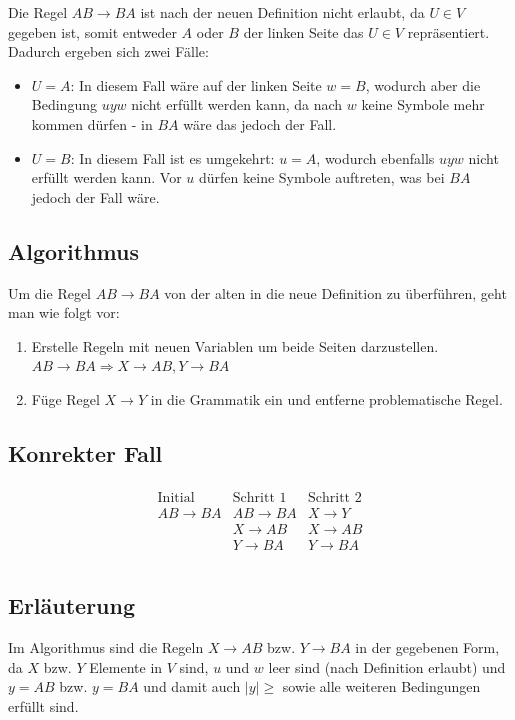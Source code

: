 \documentclass{article}
\begin{document}
Die Regel $AB\rightarrow BA$ ist nach der neuen Definition nicht erlaubt, da $U \in V$ gegeben ist, somit entweder $A$ oder $B$ der linken Seite das $U \in V$ repräsentiert. Dadurch ergeben sich zwei Fälle:
\begin{itemize}
	\item $U = A$: In diesem Fall wäre auf der linken Seite $w = B$, wodurch aber die Bedingung $uyw$ nicht erfüllt werden kann, da nach $w$ keine Symbole mehr kommen dürfen - in $BA$ wäre das jedoch der Fall.
  \item $U = B$: In diesem Fall ist es umgekehrt: $u = A$, wodurch ebenfalls $uyw$ nicht erfüllt werden kann. Vor $u$ dürfen keine Symbole auftreten, was bei $BA$ jedoch der Fall wäre.
\end{itemize}

\subsection*{Algorithmus}
Um die Regel $AB \rightarrow BA$ von der alten in die neue Definition zu überführen, geht man wie folgt vor:

\begin{enumerate}
	\item Erstelle Regeln mit neuen Variablen um beide Seiten darzustellen.\\ $AB \rightarrow BA \Rightarrow X \rightarrow AB, Y \rightarrow BA$
  \item Füge Regel $X \rightarrow Y$ in die Grammatik ein und entferne problematische Regel.
\end{enumerate}

\subsection*{Konrekter Fall}
\begin{align*}
\begin{array}{l|l|l}
\text{Initial}    & \text{Schritt 1}  & \text{Schritt 2} \\ \hline
AB \rightarrow BA & AB \rightarrow BA & X \rightarrow Y  \\
                  & X  \rightarrow AB & X \rightarrow AB \\
                  & Y  \rightarrow BA & Y \rightarrow BA \\
\end{array}
\end{align*}

\subsection*{Erläuterung}
Im Algorithmus sind die Regeln $X \rightarrow AB$ bzw. $Y \rightarrow BA$ in der gegebenen Form, da $X$ bzw. $Y$ Elemente in $V$ sind, $u$ und $w$ leer sind (nach Definition erlaubt) und $y=AB$ bzw. $y=BA$ und damit auch $|y|\geq$ sowie alle weiteren Bedingungen erfüllt sind.
\end{document}
